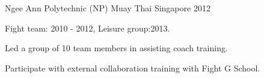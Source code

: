 

\begin{cventries}



  \cventry
    {Ngee Ann Polytechnic (NP)} %
    {Muay Thai } %
    {Singapore} %
    {2012} %
    {
      \begin{cvitems} %
        \item {Fight team: 2010 - 2012, Leisure group:2013.}
        \item {Led a group of 10 team members in assisting coach training.}
        \item {Participate with external collaboration training with Fight G School.}
      \end{cvitems}
    }

\end{cventries}
